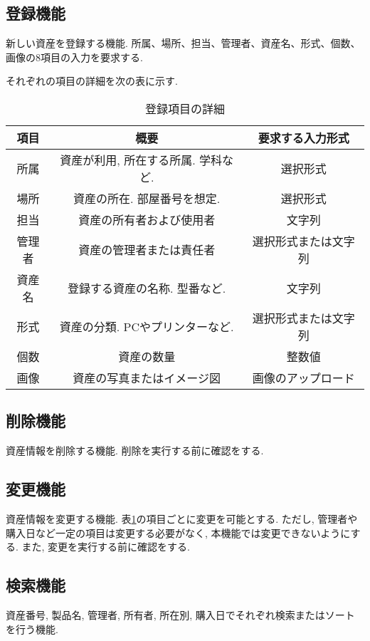 \documentclass[11ptm]{jsarticle}
\begin{document}
\subsection{登録機能}
\label{subsec:登録機能}
新しい資産を登録する機能. 所属、場所、担当、管理者、資産名、形式、個数、画像の8項目の入力を要求する. \par
それぞれの項目の詳細を次の表に示す.
\begin{table}[htpb]
  \caption{登録項目の詳細}
  \label{tb:登録項目の詳細}
  \centering
  \begin{tabular}{c|c|c}
    項目   & 概要                                & 要求する入力形式     \\
    \hline \hline
    所属   & 資産が利用, 所在する所属. 学科など. & 選択形式             \\
    \hline
    場所   & 資産の所在. 部屋番号を想定.         & 選択形式             \\
    \hline
    担当   & 資産の所有者および使用者            & 文字列               \\
    \hline
    管理者 & 資産の管理者または責任者            & 選択形式または文字列 \\
    \hline
    資産名 & 登録する資産の名称. 型番など.       & 文字列               \\
    \hline
    形式   & 資産の分類. PCやプリンターなど.     & 選択形式または文字列 \\
    \hline
    個数   & 資産の数量                          & 整数値               \\
    \hline
    画像   & 資産の写真またはイメージ図          & 画像のアップロード
  \end{tabular}
\end{table}

\subsection{削除機能}
\label{subsec:削除機能}
資産情報を削除する機能. 削除を実行する前に確認をする.

\subsection{変更機能}
\label{subsec:変更機能}
資産情報を変更する機能. 表\ref{tb:登録項目の詳細}の項目ごとに変更を可能とする. ただし, 管理者や購入日など一定の項目は変更する必要がなく, 本機能では変更できないようにする. また, 変更を実行する前に確認をする.

\subsection{検索機能}
\label{subsec:検索機能}
資産番号, 製品名, 管理者, 所有者, 所在別, 購入日でそれぞれ検索またはソートを行う機能.
\end{document}
